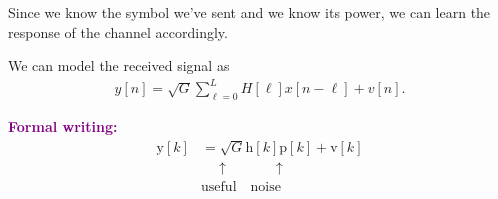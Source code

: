 \documentclass[a4paper, 12pt]{book}
\begin{document}
\vspace{0.5cm}

\noindent
\begin{minipage}{0.65\textwidth}
    Since \colorbox{yellow!20}{we know the symbol we've sent and we know its power}, \colorbox{yellow!20}{we can learn the} \colorbox{yellow!20}{response of the channel accordingly.}
    
    We can model the received signal as
    \begin{align*}
        y[n] = \sqrt{G} \sum_{\ell=0}^{L} H[\ell]x[n-\ell] + v[n].
    \end{align*}
\end{minipage}%
\hfill
\begin{minipage}{0.3\textwidth}
    \footnotesize
    \textcolor{purple}{\textbf{Formal writing:}}
    \begin{align*}
        \mathrm{y}[k] &= \sqrt{G} \mathrm{h}[k] \mathrm{p}[k] + \mathrm{v}[k] \\
        &\quad \uparrow \quad \quad \quad \uparrow \\
        &\text{useful} \quad \text{noise}
    \end{align*}
\end{minipage}
\end{document}
